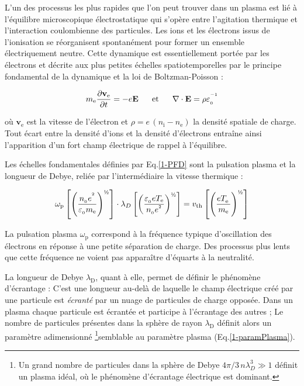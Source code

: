 L'un des processus les plus rapides que l'on peut trouver dans un plasma est lié à
l'équilibre microscopique électrostatique qui s'opère
entre l'agitation thermique et l'interaction coulombienne des particules. Les
ions et les électrons issus de l'ionisation se réorganisent spontanément pour former un ensemble électriquement neutre.
Cette dynamique est essentiellement portée par les électrons et décrite aux plus petites
échelles spatiotemporelles par le principe fondamental de la dynamique et la loi de Boltzman-Poisson :

\begin{align}
\label{1-PFD}
m_\text{e}\frac{\partial \mathbf{v}_\text{e}}{\partial t}=-e\mathbf E
\;\;\;\;\;\;\text{et}\;\;\;\;\;\;
\nabla\cdot\mathbf{E}=\rho\varepsilon_{_{0}}^{^{-1}}
\end{align}

où $\mathbf{v}_\text{e}$ est la vitesse de l'électron et
$\rho=e\,(n_\text{i}-n_\text{e})$ la densité spatiale de charge.
Tout écart entre la densité d'ions et la densité d'électrons
entraîne ainsi l'apparition d'un fort champ électrique de rappel à l'équilibre.

Les échelles fondamentales définies par Eq.\ref{1-PFD} sont la pulsation
plasma et la longueur de Debye, reliée par l'intermédiaire la vitesse thermique :

\begin{equation}
\omega_\text{p}\left[\left(\frac{n\indice{0}
e\puissance{2}}{\varepsilon\indice{0} m_\text{e}}\right)^{\text{\textonehalf}}
\right]\cdot\lambda_D\left[\left(\frac{\varepsilon\indice{0}
eT_\text{e}}{n\indice{0} e\puissance{2}}\right)^{\text{\textonehalf}}\right]
=v_\text{th}\left[\left(\frac{eT_\text{e}^{^{\phantom{1}}}}{m_\text{e}}\right)^{\text{\textonehalf}}\right]
\end{equation}

La pulsation plasma $\omega_\text{p}$ correspond à la fréquence typique
d'oscillation des électrons en réponse à une petite séparation de charge. Des processus plus lents que cette fréquence ne voient
pas apparaître d'équarts à la neutralité. 

La longueur de Debye $\lambda_\text{D}$, quant à elle, permet de définir le
phénomène d'écrantage :
C'est une longueur au-delà de laquelle le champ électrique créé par une particule est \emph{écranté} par 
un nuage de particules de charge opposée. Dans un plasma chaque particule est écrantée et participe
à l'écrantage des autres ; Le nombre de particules présentes
dans la sphère de rayon $\lambda_\text{D}$ définit alors un paramètre
adimensionné \footnote{Un
grand nombre de particules dans la sphère de Debye $4\pi/3\,n\lambda_D^3\gg1$
définit un plasma idéal, où le phénomène d'écrantage électrique est
dominant.}semblable au paramètre plasma (Eq.\ref{1-paramPlasma}).

